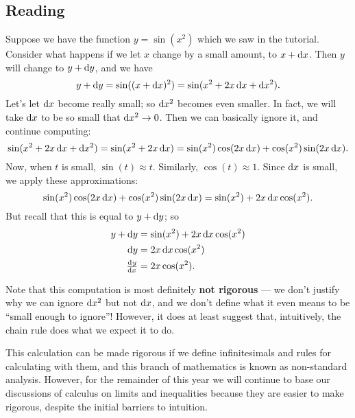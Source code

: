 


\subsection*{Reading}
Suppose we have the function $ y = \sin(x^2) $ which we saw in the tutorial. Consider
what happens if we let $ x $ change by a small amount, to $ x + \dif{x} $. Then $ y $
will change to $ y + \dif{y} $, and we have
\begin{displaymath}
  y + \dif{y} = \sin((x + \dif{x})^2) = \sin(x^2 + 2 x\dif{x} + \dif{x}^2).
\end{displaymath}
Let's let $ \dif{x} $ become really small; so $ \dif{x}^2 $ becomes even smaller. In fact, we
will take $ \dif{x} $ to be so small that $ \dif{x}^2 \to 0 $. Then we can basically ignore
it, and continue computing:
\begin{displaymath}
  \sin(x^2 + 2 x\dif{x} + \dif{x}^2) = \sin(x^2 + 2 x\dif{x}) = \sin(x^2) \cos(2x\dif{x}) + \cos(x^2) \sin(2x \dif{x}).
\end{displaymath}
Now, when $ t $ is small, $ \sin(t) \approx t $. Similarly, $ \cos(t) \approx 1 $. Since $ \dif{x} $ is small,
we apply these approximations:
\begin{displaymath}
  \sin(x^2) \cos(2x\dif{x}) + \cos(x^2) \sin(2x \dif{x}) = \sin(x^2) + 2x\dif{x} \cos(x^2).
\end{displaymath}
But recall that this is equal to $ y + \dif{y} $; so
\begin{align*}
  y + \dif{y} &= \sin(x^2) + 2x\dif{x} \cos(x^2)\\
  \dif{y} &= 2x \dif{x} \cos(x^2)\\
  \od{y}{x} &= 2x \cos(x^2).
\end{align*}

Note that this computation is most definitely \textbf{not rigorous} --- we don't justify why we can
ignore $ \dif{x}^2 $ but not $ \dif{x} $, and we don't define what it even means to be ``small enough
to ignore''! However, it does at least suggest that, intuitively, the chain rule does what we expect it
to do.

This calculation can be made rigorous if we define infinitesimals and rules for calculating with them,
and this branch of mathematics is known as non-standard analysis. However, for the remainder of this
year we will continue to base our discussions of calculus on limits and inequalities because they are
easier to make rigorous, despite the initial barriers to intuition.

